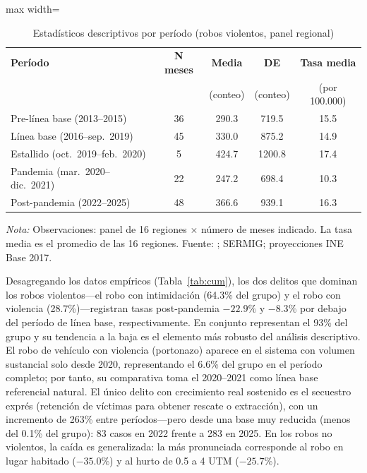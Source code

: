 \documentclass[12pt,a4paper]{article}
\newcommand{\tablenote}[1]{%
  \vspace{2pt}%
  \begin{minipage}{\linewidth}%
    \footnotesize\textit{Nota:} #1%
  \end{minipage}%
}
\begin{document}
\begin{table}[H]
\centering
\caption{Estad\'isticos descriptivos por per\'iodo (robos violentos, panel regional)}
\label{tab:descriptivo}
\small
\begin{adjustbox}{max width=\columnwidth}
\begin{tabular}{lcccc}
\toprule
\textbf{Per\'iodo} & \textbf{N meses} & \textbf{Media} & \textbf{DE} & \textbf{Tasa media} \\
 & & (conteo) & (conteo) & (por 100.000) \\
\midrule
Pre-l\'inea base (2013--2015)       & 36 & 290.3 & 719.5 & 15.5 \\
L\'inea base (2016--sep.\ 2019)     & 45 & 330.0 & 875.2 & 14.9 \\
Estallido (oct.\ 2019--feb.\ 2020)  &  5 & 424.7 & 1200.8 & 17.4 \\
Pandemia (mar.\ 2020--dic.\ 2021)   & 22 & 247.2 & 698.4 & 10.3 \\
Post-pandemia (2022--2025)          & 48 & 366.6 & 939.1 & 16.3 \\
\bottomrule
\end{tabular}
\end{adjustbox}
\tablenote{Observaciones: panel de 16 regiones $\times$ n\'umero de meses indicado.
La tasa media es el promedio de las 16 regiones. Fuente: \citet{INE2026};
SERMIG; proyecciones INE Base 2017.}
\end{table}

Desagregando los datos emp\'iricos (Tabla~\ref{tab:cum}), los dos delitos que dominan los robos
violentos---el robo con intimidaci\'on (64.3\% del grupo) y el robo con
violencia (28.7\%)---registran tasas post-pandemia $-22.9\%$ y $-8.3\%$ por debajo del
per\'iodo de l\'inea base, respectivamente. En conjunto representan el 93\% del grupo
y su tendencia a la baja es el elemento m\'as robusto del an\'alisis descriptivo. El
robo de veh\'iculo con violencia (portonazo) aparece en el sistema con volumen sustancial solo desde 2020,
representando el 6.6\% del grupo en el per\'iodo completo; por tanto, su comparativa toma el 2020--2021 como l\'inea base
referencial natural. El \'unico delito con
crecimiento real sostenido es el secuestro expr\'es (retenci\'on de v\'ictimas para obtener rescate o extracci\'on),
con un incremento de 263\% entre per\'iodos---pero desde una base muy reducida (menos
del 0.1\% del grupo): 83 casos en 2022 frente a 283 en 2025. En los robos no violentos,
la ca\'ida es generalizada: la m\'as pronunciada corresponde al robo en lugar habitado
($-35.0\%$) y al hurto de 0.5 a 4 UTM ($-25.7\%$).
\end{document}
